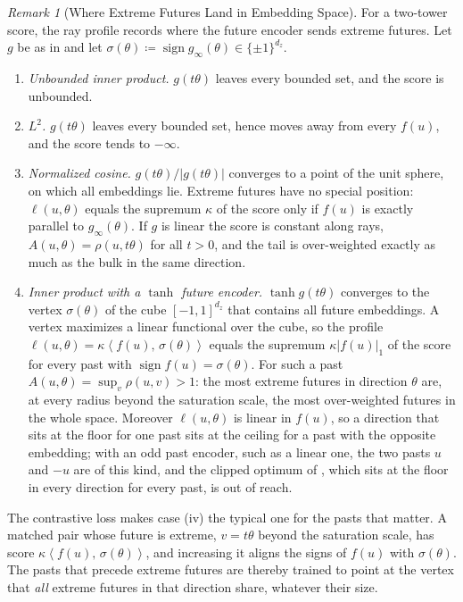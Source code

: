 \documentclass[11pt]{article}
\theoremstyle{plain}
\theoremstyle{definition}
\theoremstyle{remark}
\newtheorem{remark}[theorem]{Remark}
\newcommand{\define}{\coloneqq}
\newcommand{\IP}[2]{\left\langle #1,\, #2 \right\rangle}
\newcommand{\abs}[1]{\left\lvert #1 \right\rvert}
\begin{document}
\begin{remark}[Where Extreme Futures Land in Embedding Space]
 \label{rem:corners}
 For a two-tower score, the ray profile records where the future encoder
 sends extreme futures. Let $g$ be as in  and let
 $\sigma(\theta)\define\operatorname{sign}g_\infty(\theta)\in\{\pm1\}^{d_z}$.
 \begin{enumerate}[label=(\roman*)]
  \item \emph{Unbounded inner product.} $g(t\theta)$ leaves every bounded
        set, and the score is unbounded.
  \item \emph{$L^2$.} $g(t\theta)$ leaves every bounded set, hence moves
        away from every $f(u)$, and the score tends to $-\infty$.
  \item \emph{Normalized cosine.} $g(t\theta)/\abs{g(t\theta)}$ converges to
        a point of the unit sphere, on which all embeddings lie. Extreme
        futures have no special position: $\ell(u,\theta)$ equals the
        supremum $\kappa$ of the score only if $f(u)$ is exactly parallel to
        $g_\infty(\theta)$. If $g$ is linear the score is constant along
        rays, $A(u,\theta)=\rho(u,t\theta)$ for all $t>0$, and the tail is
        over-weighted exactly as much as the bulk in the same direction.
  \item \emph{Inner product with a $\tanh$ future encoder.}
        $\tanh g(t\theta)$ converges to the vertex $\sigma(\theta)$ of the
        cube $[-1,1]^{d_z}$ that contains all future embeddings. A vertex
        maximizes a linear functional over the cube, so the profile
        $\ell(u,\theta)=\kappa\IP{f(u)}{\sigma(\theta)}$ equals the supremum
        $\kappa\abs{f(u)}_{1}$ of the score for every past with
        $\operatorname{sign}f(u)=\sigma(\theta)$. For such a past
        $A(u,\theta)=\sup_v\rho(u,v)>1$: the most extreme futures in
        direction $\theta$ are, at every radius beyond the saturation scale,
        the most over-weighted futures in the whole space. Moreover
        $\ell(u,\theta)$ is linear in $f(u)$, so a direction that sits at the
        floor for one past sits at the ceiling for a past with the opposite
        embedding; with an odd past encoder, such as a linear one, the two
        pasts $u$ and $-u$ are of this kind, and the clipped optimum of
        , which sits at the floor in every direction for
        every past, is out of reach.
 \end{enumerate}
 The contrastive loss makes case (iv) the typical one for the pasts that
 matter. A matched pair whose future is extreme, $v=t\theta$ beyond the
 saturation scale, has score $\kappa\IP{f(u)}{\sigma(\theta)}$, and
 increasing it aligns the signs of $f(u)$ with $\sigma(\theta)$. The pasts
 that precede extreme futures are thereby trained to point at the vertex
 that \emph{all} extreme futures in that direction share, whatever their
 size.
\end{remark}
\end{document}
